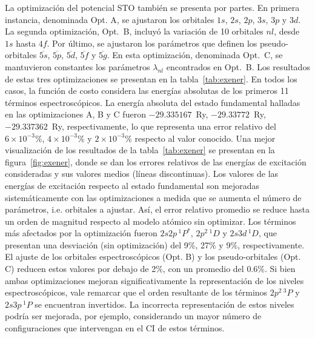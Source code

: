 La optimización del potencial STO también se presenta por partes. En 
primera instancia, denominada Opt. A, se ajustaron los orbitales $1s$, 
$2s$, $2p$, $3s$, $3p$ y $3d$. La segunda optimización, Opt.~B, incluyó
la variación de 10 orbitales $nl$, desde $1s$ hasta $4f$. Por último, se 
ajustaron los parámetros que definen los pseudo-orbitales 
$\overline{5s}$, $\overline{5p}$, $\overline{5d}$, $\overline{5f}$ y 
$\overline{5g}$. En esta optimización, denominada Opt.~C, se mantuvieron 
constantes los parámetros $\lambda_{nl}$ encontrados en Opt.~B. Los 
resultados de estas tres optimizaciones se presentan en la 
tabla~\ref{tab:exener}. En todos los casos, la función de costo considera 
las energías absolutas de los primeros 11 términos espectroscópicos. La 
energía absoluta del estado fundamental halladas en las optimizaciones 
A, B y C fueron $-29.335167$~Ry, $-29.33772$~Ry, $-29.337362$~Ry, 
respectivamente, lo que representa una error relativo del 
$6\times 10^{-3}\%$, $4\times 10^{-3}\%$ y $2\times 10^{-3}\%$ respecto 
al valor conocido. Una mejor visualización de los resultados de la 
tabla~\ref{tab:exener} se presentan en la figura~\ref{fig:exener}, donde 
se dan los errores relativos de las energías de excitación consideradas 
y sus valores medios (líneas discontinuas). Los valores de las energías 
de excitación respecto al estado fundamental son mejoradas 
sistemáticamente con las optimizaciones a medida que se aumenta el número 
de parámetros, i.e. orbitales a ajustar. Así, el error relativo promedio 
se reduce hasta un orden de magnitud respecto al modelo atómico sin 
optimizar. Los términos más afectados por la optimización fueron 
$2s2p\,^1P^*$, $2p^2\,^1D$ y $2s3d\,^1D$, que presentan una desviación 
(sin optimización) del 9\%, 27\% y 9\%, respectivamente. El ajuste de los 
orbitales espectroscópicos (Opt. B) y los pseudo-orbitales (Opt. C) 
reducen estos valores por debajo de 2\%, con un promedio del $0.6\%$. Si 
bien ambas optimizaciones mejoran significativamente la representación de 
los niveles espectroscópicos, vale remarcar que el orden resultante de 
los términos $2p^2\,^3P$ y $2s3p\,^1P$ se encuentran invertidos. La 
incorrecta representación de estos niveles podría ser mejorada, por 
ejemplo, considerando un mayor número de configuraciones que intervengan 
en el CI de estos términos.

